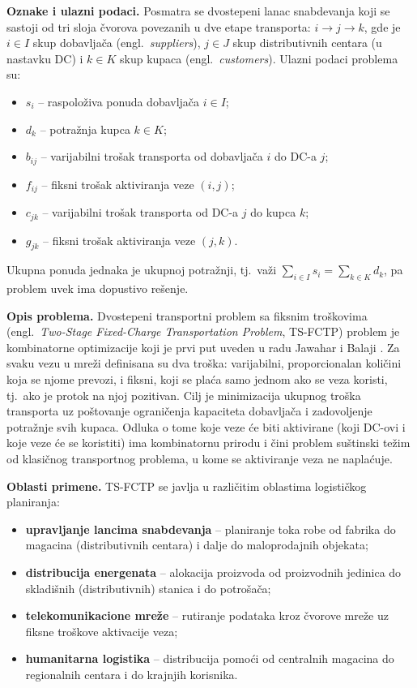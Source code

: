 \documentclass[12pt,a4paper]{article}
\begin{document}
\textbf{Oznake i ulazni podaci.}
Posmatra se dvostepeni lanac snabdevanja koji se sastoji od tri sloja čvorova
povezanih u dve etape transporta: $i \rightarrow j \rightarrow k$, gde je
$i \in I$ skup dobavljača (engl.\ \textit{suppliers}), $j \in J$ skup
distributivnih centara (u nastavku DC) i $k \in K$ skup kupaca (engl.\
\textit{customers}). Ulazni podaci problema su:
\begin{itemize}
  \item $s_i$ -- raspoloživa ponuda dobavljača $i \in I$;
  \item $d_k$ -- potražnja kupca $k \in K$;
  \item $b_{ij}$ -- varijabilni trošak transporta od dobavljača $i$ do DC-a $j$;
  \item $f_{ij}$ -- fiksni trošak aktiviranja veze $(i,j)$;
  \item $c_{jk}$ -- varijabilni trošak transporta od DC-a $j$ do kupca $k$;
  \item $g_{jk}$ -- fiksni trošak aktiviranja veze $(j,k)$.
\end{itemize}
Ukupna ponuda jednaka je ukupnoj potražnji, tj.\ važi
$\sum_{i \in I} s_i = \sum_{k \in K} d_k$, pa problem uvek ima dopustivo
rešenje.

\textbf{Opis problema.}
Dvostepeni transportni problem sa fiksnim troškovima (engl.\
\textit{Two-Stage Fixed-Charge Transportation Problem}, TS-FCTP) problem je
kombinatorne optimizacije koji je prvi put uveden u radu Jawahar i Balaji
\cite{jb2009}. Za svaku vezu u mreži definisana su dva troška: varijabilni,
proporcionalan količini koja se njome prevozi, i fiksni, koji se plaća samo
jednom ako se veza koristi, tj.\ ako je protok na njoj pozitivan. Cilj je
minimizacija ukupnog troška transporta uz poštovanje ograničenja kapaciteta
dobavljača i zadovoljenje potražnje svih kupaca. Odluka o tome koje veze
će biti aktivirane (koji DC-ovi i koje veze će se koristiti) ima kombinatornu
prirodu i čini problem suštinski težim od klasičnog transportnog problema, u
kome se aktiviranje veza ne naplaćuje.

\textbf{Oblasti primene.}
TS-FCTP se javlja u različitim oblastima logističkog planiranja:
\begin{itemize}
  \item \textbf{upravljanje lancima snabdevanja} -- planiranje toka robe od
    fabrika do magacina (distributivnih centara) i dalje do maloprodajnih
    objekata;
  \item \textbf{distribucija energenata} -- alokacija proizvoda od proizvodnih
    jedinica do skladišnih (distributivnih) stanica i do potrošača;
  \item \textbf{telekomunikacione mreže} -- rutiranje podataka kroz čvorove
    mreže uz fiksne troškove aktivacije veza;
  \item \textbf{humanitarna logistika} -- distribucija pomoći od centralnih
    magacina do regionalnih centara i do krajnjih korisnika.
\end{itemize}
\end{document}
